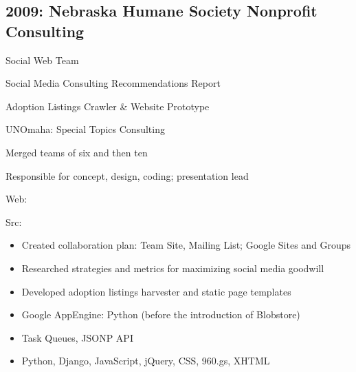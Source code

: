 \documentclass[letter,,openany,oneside,english]{sphinxhowto}
\begin{document}
\subsection{2009: Nebraska Humane Society Nonprofit Consulting}
\label{\detokenize{resume:id2}}
\begin{DUlineblock}{0em}
\item[] Social Web Team
\item[] Social Media Consulting Recommendations Report
\item[] Adoption Listings Crawler \& Website Prototype
\item[] UNOmaha: Special Topics Consulting
\item[] Merged teams of six and then ten
\item[] Responsible for concept, design, coding; presentation lead
\item[] Web: 
\item[] Src: 
\end{DUlineblock}
\begin{itemize}
\item {} 
Created collaboration plan: Team Site, Mailing List; Google Sites and Groups

\item {} 
Researched strategies and metrics for maximizing social media goodwill

\item {} 
Developed adoption listings harvester and static page templates

\item {} 
Google AppEngine: Python (before the introduction of Blobstore)

\item {} 
Task Queues, JSONP API

\item {} 
Python, Django, JavaScript, jQuery, CSS, 960.gs, XHTML

\end{itemize}
\end{document}
